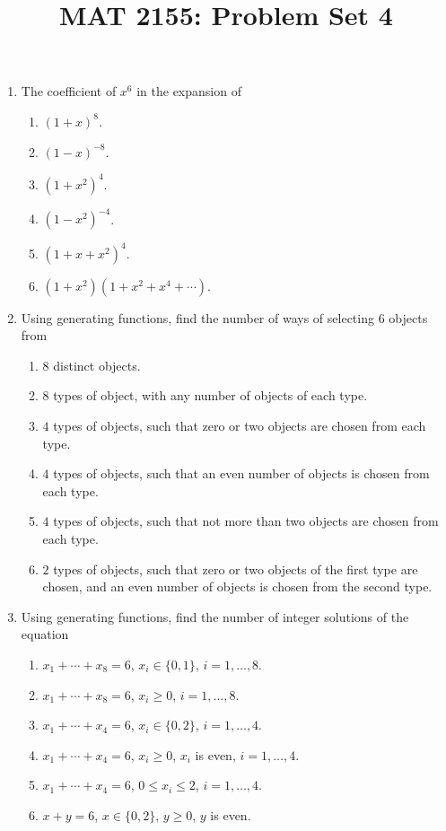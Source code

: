 \documentclass[svgnames]{amsart}
\title{MAT 2155: Problem Set 4}
\date{}
\begin{document}
\maketitle
\begin{enumerate}[leftmargin=*]
\item The coefficient of $x^6$ in the expansion of
\begin{enumerate}[label=(\roman*)]
	\item $(1 + x)^8$.
	\item $(1 - x)^{-8}$.
	\item $(1 + x^2)^4$.
	\item $(1 - x^2)^{-4}$.
	\item $(1 + x + x^2)^4$.
	\item $(1 + x^2)(1 + x^2 + x^4 + \cdots)$.
\end{enumerate}

\item Using generating functions, find the number of ways of selecting $6$ objects from
\begin{enumerate}[label=(\roman*)]
	\item $8$ distinct objects.
	\item $8$ types of object, with any number of objects of each type.
	\item $4$ types of objects, such that zero or two objects are chosen from each type.
	\item $4$ types of objects, such that an even number of objects is chosen from each type.
	\item $4$ types of objects, such that not more than two objects are chosen from each type.
	\item $2$ types of objects, such that zero or two objects of the first type are chosen, and an even number of objects is chosen from the second type.
\end{enumerate}

\item Using generating functions, find the number of integer solutions of the equation
\begin{enumerate}[label=(\roman*)]
	\item $x_1 + \cdots + x_8 = 6$, $x_i \in \{0, 1\}$, $i = 1, \ldots, 8$.
	\item $x_1 + \cdots + x_8 = 6$, $x_i \ge 0$, $i = 1, \ldots, 8$.
	\item $x_1 + \cdots + x_4 = 6$, $x_i \in \{0, 2\}$, $i = 1, \ldots, 4$.
	\item $x_1 + \cdots + x_4 = 6$, $x_i \ge 0$, $x_i$ is even, $i = 1, \ldots, 4$.
	\item $x_1 + \cdots + x_4 = 6$, $0 \le x_i \le 2$, $i = 1, \ldots, 4$.
	\item $x + y = 6$, $x \in \{0, 2\}$, $y \ge 0$, $y$ is even.
\end{enumerate}


\end{enumerate}
\end{document}
